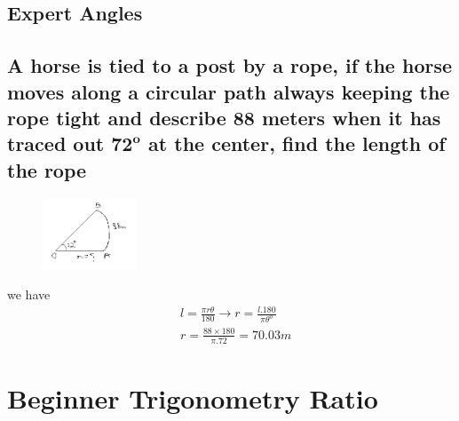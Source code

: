 \documentclass{article}
\begin{document}
\begin{multicols}{2}
\section{Expert Angles}

\subsection{A horse is tied to a post by a rope, if the horse moves along a circular path always keeping the rope tight and describe 88 meters when it has traced out $\mathbf{72^o}$ at the center, find the length of the rope}

\begin{figure}[H]
    \centering
    \includegraphics[width=0.25\textwidth]{begin-angles7.png}
\end{figure}

we have
\begin{align*}
    &l = \frac{\pi r \theta}{180} \rightarrow r= \frac{l.180}{\pi \theta^o} \\
    &r = \frac{88\times 180}{\pi.72} = 70.03 m
\end{align*}

\end{multicols}

\section{Beginner Trigonometry Ratio}
\end{document}
